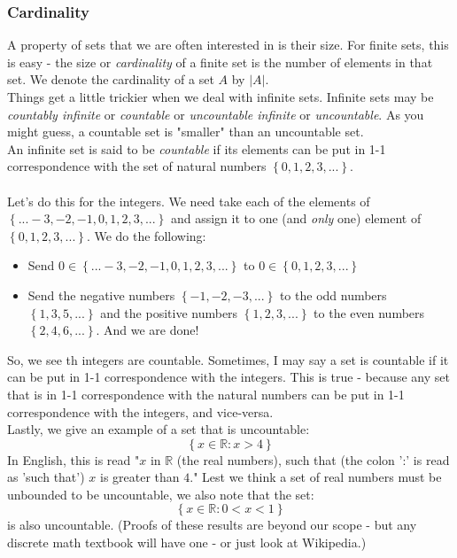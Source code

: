 \documentclass[12pt]{article} %
\begin{document}
\subsubsection{Cardinality}
A property of sets that we are often interested in is their size. For finite sets, this is easy - the size or \emph{cardinality} of a finite set is the number of elements in that set. We denote the cardinality of a set $A$ by $|A|$.\\
 Things get a little trickier when we deal with infinite sets. Infinite sets may be \emph{countably infinite} or \emph{countable} or \emph{uncountable infinite} or \emph{uncountable}. As you might guess, a countable set is "smaller" than an uncountable set.\\
An infinite set is said to be \emph{countable} if its elements can be put in 1-1 correspondence with the set of natural numbers $\left\{0,1,2,3,...\right\}$. \\\\
Let's do this for the integers. We need take each of the elements of $\left\{...-3,-2,-1,0,1,2,3,...\right\}$ and assign it to one (and \emph{only} one) element of $\left\{0,1,2,3,...\right\}$. We do the following:
\begin{itemize}
\item Send $0 \in \left\{...-3,-2,-1,0,1,2,3,...\right\}$ to $0 \in \left\{0,1,2,3,...\right\}$
\item Send the negative numbers $\left\{-1,-2,-3,...\right\}$ to the odd numbers $\left\{1,3,5,...\right\}$ and the positive numbers $\left\{1,2,3,...\right\}$ to the even numbers $\left\{2,4,6,...\right\}$. And we are done!
\end{itemize}
So, we see th integers are countable. Sometimes, I may say a set is countable if it can be put in 1-1 correspondence with the integers. This is true - because any set that is in 1-1 correspondence with the natural numbers can be put in 1-1 correspondence with the integers, and vice-versa.\\
Lastly, we give an example of a set that is uncountable:
$$\left\{x\in\mathbb{R}:x>4\right\}$$
In English, this is read "$x$ in $\mathbb{R}$ (the real numbers), such that (the colon ':' is read as 'such that') $x$ is greater than $4$." Lest we think a set of real numbers must be unbounded to be uncountable, we also note that the set:
$$\left\{x\in \mathbb{R}: 0<x<1\right\}$$
is also uncountable. (Proofs of these results are beyond our scope - but any discrete math textbook will have one - or just look at Wikipedia.)
\end{document}
